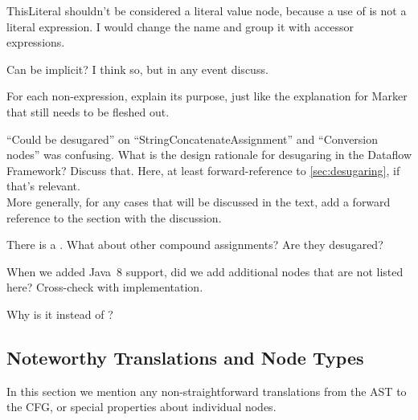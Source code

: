 \begin{workinprogress}
ThisLiteral shouldn't be considered a literal value node, because a use of
 is not a literal expression.  I would change the name and group
it with accessor expressions.
\end{workinprogress}

\begin{workinprogress}
Can  be implicit?  I think so, but in any event discuss.
\end{workinprogress}

\begin{workinprogress}
For each non-expression, explain its purpose, just like the explanation for
Marker that still needs to be fleshed out.
\end{workinprogress}

\begin{workinprogress}
``Could be desugared'' on ``StringConcatenateAssignment'' and ``Conversion
nodes'' was confusing.  What is the design rationale for
desugaring in the Dataflow Framework?   Discuss that.  Here, at least
forward-reference to \autoref{sec:desugaring}, if that's relevant. \\
More generally, for any cases that will be discussed in the text, add a
forward reference to the section with the discussion.
\end{workinprogress}

\begin{workinprogress}
There is a .
What about other compound assignments? Are they desugared?
\end{workinprogress}

\begin{workinprogress}
When we added Java~8 support, did we add additional nodes that are not
listed here? Cross-check with implementation.
\end{workinprogress}

\begin{workinprogress}
Why is it  instead of ?
\end{workinprogress}


\subsection{Noteworthy Translations and Node Types}
\label{sec:noteworthy-translations}

In this section we mention any non-straightforward translations from the AST to
the CFG, or special properties about individual nodes.


